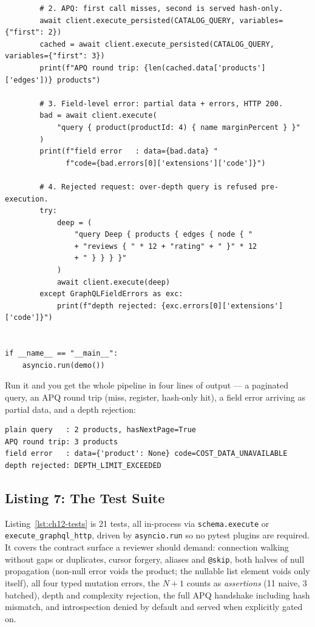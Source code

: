 \begin{verbatim}
        # 2. APQ: first call misses, second is served hash-only.
        await client.execute_persisted(CATALOG_QUERY, variables={"first": 2})
        cached = await client.execute_persisted(CATALOG_QUERY, variables={"first": 3})
        print(f"APQ round trip: {len(cached.data['products']['edges'])} products")

        # 3. Field-level error: partial data + errors, HTTP 200.
        bad = await client.execute(
            "query { product(productId: 4) { name marginPercent } }"
        )
        print(f"field error   : data={bad.data} "
              f"code={bad.errors[0]['extensions']['code']}")

        # 4. Rejected request: over-depth query is refused pre-execution.
        try:
            deep = (
                "query Deep { products { edges { node { "
                + "reviews { " * 12 + "rating" + " }" * 12
                + " } } } }"
            )
            await client.execute(deep)
        except GraphQLFieldErrors as exc:
            print(f"depth rejected: {exc.errors[0]['extensions']['code']}")


if __name__ == "__main__":
    asyncio.run(demo())
\end{verbatim}

Run it and you get the whole pipeline in four lines of output --- a
paginated query, an APQ round trip (miss, register, hash-only hit), a
field error arriving as partial data, and a depth rejection:

\begin{verbatim}
plain query   : 2 products, hasNextPage=True
APQ round trip: 3 products
field error   : data={'product': None} code=COST_DATA_UNAVAILABLE
depth rejected: DEPTH_LIMIT_EXCEEDED
\end{verbatim}

\subsection{Listing 7: The Test Suite}
\label{subsec:ch12-code-tests}

Listing~\ref{lst:ch12-tests} is 21 tests, all in-process via
\texttt{schema.execute} or \texttt{execute\_graphql\_http}, driven by
\texttt{asyncio.run} so no pytest plugins are required. It covers the
contract surface a reviewer should demand: connection walking without
gaps or duplicates, cursor forgery, aliases and \texttt{@skip}, both
halves of null propagation (non-null error voids the product; the
nullable list element voids only itself), all four typed mutation errors,
the $N{+}1$ counts as \emph{assertions} (11 naive, 3 batched), depth and
complexity rejection, the full APQ handshake including hash mismatch, and
introspection denied by default and served when explicitly gated on.

